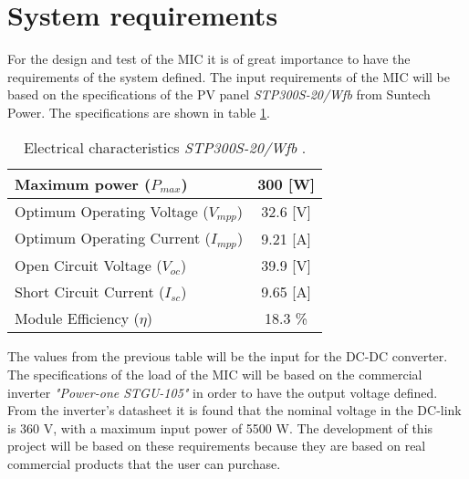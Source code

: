 \section{System requirements}

For the design and test of the MIC it is of great importance to have the requirements of the system defined. The input requirements of the MIC will be based on the specifications of the PV panel \textit{STP300S-20/Wfb} from Suntech Power. The specifications are shown in table \ref{el_charact_PV_panel}.

\begin{table}[H]
	\centering
	\begin{tabular}{ |l|c| } 
		\hline
		Maximum power ($P_{max}$) & 300 [W]  \\ \hline
		Optimum Operating Voltage ($V_{mpp}$) & 32.6 [V]  \\ \hline
		Optimum Operating Current ($I_{mpp}$) & 9.21 [A]  \\ \hline
		Open Circuit Voltage ($V_{oc}$) &  39.9 [V]\\ \hline
		Short Circuit Current ($I_{sc}$) & 9.65 [A]  \\ \hline
		Module Efficiency ($\eta$) & 18.3 \%  \\ \hline
	\end{tabular}
	\caption{Electrical characteristics \textit{STP300S-20/Wfb} \cite{PV_panel}.}
	\label{el_charact_PV_panel}
\end{table}

The values from the previous table will be the input for the DC-DC converter. The specifications of the load of the MIC will be based on the commercial inverter \textit{"Power-one STGU-105"}\cite{power_one_inverter} in order to have the output voltage defined. From the inverter's datasheet it is found that the nominal voltage in the DC-link is 360 V, with a maximum input power of 5500 W. \newline
The development of this project will be based on these requirements because they are based on real commercial products that the user can purchase. 


